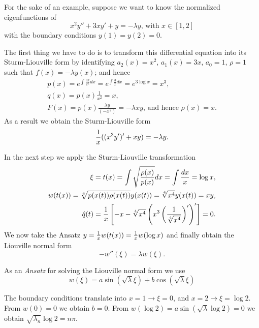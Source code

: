 {
\color{blue}
\bexample

For the sake of an example, suppose we want to know the normalized eigenfunctions of
\begin{equation}
x^2y'' + 3xy' + y =- \lambda y \textrm{, with } x\in [1,2]
\end{equation}
with the boundary conditions $y(1) = y(2) =0$.

The first thing we have to do is to  transform this differential equation
into its Sturm-Liouville form by identifying $a_2(x)=x^2$,
$a_1(x)=   3x$, $a_0 =1$, $\rho = 1$ such that $f (x)= - \lambda y (x)$; and hence
\begin{equation}
\begin{split}
p(x)=e^{\int \frac{ 3x }{ x^2 } dx}=e^{\int \frac{3}{x} dx}=e^{3\log{x}}=x^3,\\
q(x)=p(x) \frac{ 1 }{ x^2 }= x,\\
F(x)=p(x) \frac{\lambda y}{(-x^2)}= -\lambda x y\textrm{, and hence } \rho(x)= x
.
\end{split}
\end{equation}
As a result we obtain the  Sturm-Liouville form
\begin{equation}
{1\over x}((x^3y')' + xy)=-\lambda y .
\end{equation}

In the next step we apply the Sturm-Liouville transformation
\begin{equation}
\begin{split}
\xi= t (x)  =\int\sqrt{\rho (x)\over p(x)}dx=\int{dx\over x}=\log x,\\
w(t(x))=\sqrt[4]{p(x(t))\rho(x(t))} y (x(t))= \sqrt[4]{x^4} y (x(t))= x y,\\
\hat{q}(t)= \frac{1}{x}\left[-x -\sqrt[4]{x^4 }
\left(x^3\left( \frac{1}{\sqrt[4]{x^4 }}\right)'\right)'\right] =0
.
\end{split}
\end{equation}
We now take the {Ansatz} $y={1\over x} w ( t (x))={1\over x} w (\log x)$
and finally obtain  the Liouville normal form
\begin{equation}
- w '' (\xi)=\lambda  w (\xi) .
\end{equation}

As an {\em Ansatz}
for solving the Liouville normal form we use
\begin{equation}   w (\xi)=a\sin(\sqrt{\lambda}\xi)+b\cos(\sqrt{\lambda}\xi)
\end{equation}

The boundary conditions translate into $x=1\rightarrow\xi=0$,
and $x=2\rightarrow \xi=\log 2$.
From
$w (0)=0$ we obtain $b=0$.
From
$w (\log 2)=a\sin(\sqrt{\lambda}\log2)=0$
we obtain
$\sqrt{\lambda_n}\log2=n\pi$.

}
